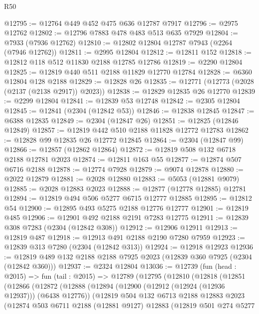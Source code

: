 \begin{lexlean}{R50}
\begin{coremodule}
@12795 := @12764 @449 @452 @475 @636 @12787 @7917
@12796 := @2975 @12762
@12802 := @12796 @7883 @478 @483 @513 @635 @7929
@12804 := @7933 (@7936 @12762)
@12810 := @12802 @12804 @12787 @7943 (@2264 (@7946 @12762))
@12811 := @2995 @12804
@12812 := @12811 @152
@12818 := @12812 @118 @512 @11830 @2188 @12785 @12786
@12819 := @2290 @12804
@12825 := @12819 @440 @511 @2188 @11829 @12770 @12784
@12828 := @6360 @12804 @128 @2188
@12829 := @12828 @26
@12835 := @12771 (@12773 (@2028 (@2137 (@2138 @2917)) @2023))
@12838 := @12829 @12835 @26 @12770
@12839 := @2299 @12804
@12841 := @12839 @53 @12748
@12842 := @2305 @12804
@12845 := @12841 (@2304 (@12842 @53))
@12846 := @12838 @12845
@12847 := @6388 @12835
@12849 := @2304 (@12847 @26)
@12851 := @12825 (@12846 @12849)
@12857 := @12819 @442 @510 @2188 @11828 @12772 @12783
@12862 := @12828 @99 @12835 @26 @12772 @12845
@12864 := @2304 (@12847 @99)
@12866 := @12857 (@12862 @12864)
@12872 := @12819 @508 @132 @6718 @2188 @12781 @2023
@12874 := @12811 @163 @55
@12877 := @12874 @507 @6716 @2188
@12878 := @12774 @7928
@12879 := @9074 @12878
@12880 := @2022 @12879
@12881 := @2028 @12880
@12883 := @5053 (@12881 @9079)
@12885 := @2028 @12883 @2023
@12888 := @12877 (@12778 @12885) @12781
@12894 := @12819 @494 @506 @5277 @6715 @12777 @12885
@12895 := @12812 @54
@12900 := @12895 @493 @5275 @2188 @12776 @12777
@12901 := @12819 @485
@12906 := @12901 @492 @2188 @2191 @7283 @12775
@12911 := @12839 @308 @7283 (@2304 (@12842 @308))
@12912 := @12906 @12911
@12913 := @12819 @487
@12918 := @12913 @491 @2188 @2190 @7280 @7959
@12923 := @12839 @313 @7280 (@2304 (@12842 @313))
@12924 := @12918 @12923
@12936 := @12819 @489 @132 @2188 @2188 @7925 @2023 (@12839 @360 @7925 (@2304 (@12842 @360)))
@12937 := @2324 @12804
@13036 := @12739
    (fun (head : @2015) =>
    fun (tail : @2015) =>
    @12789
      (@12795
        (@12810
          (@12818
            (@12851
              (@12866
                (@12872
                  (@12888
                    (@12894
                      (@12900 (@12912 (@12924 (@12936 @12937))) (@6438 @12776))
                      (@12819
                        @504
                        @132
                        @6713
                        @2188
                        @12883
                        @2023
                        (@12874
                          @503
                          @6711
                          @2188
                          (@12881 @9127)
                          @12883
                          (@12819
                            @501
                            @274
                            @5277

\end{coremodule}
\end{lexlean}

